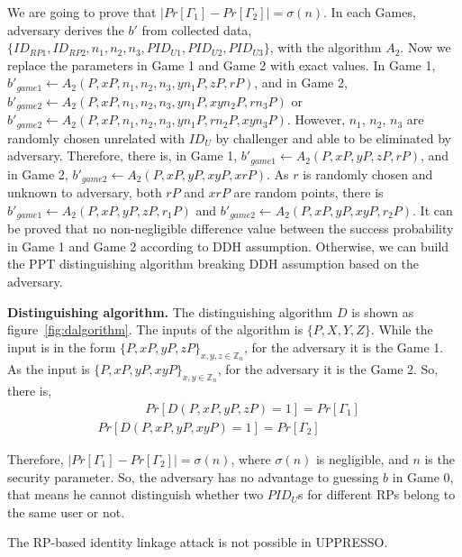 We are going to prove that $|Pr[\Gamma_1]-Pr[\Gamma_2]|=\sigma(n)$. In each Games, adversary derives the $b'$ from collected data, $\{ID_{RP1},ID_{RP2},n_1,n_2,n_3,PID_{U1},PID_{U2},PID_{U3}\}$, with the algorithm $A_2$. Now we replace the parameters in Game 1 and Game 2 with exact values. In Game 1, $b'_{game1}\gets A_2(P,xP,n_1,n_2,n_3,yn_1P,zP,rP)$, and in Game 2, $b'_{game2}\gets A_2(P,xP,n_1,n_2,n_3,yn_1P,xyn_2P,rn_3P)$ or $b'_{game2}\gets A_2(P,xP,n_1,n_2,n_3,yn_1P,rn_2P,xyn_3P)$. 
However, $n_1$, $n_2$, $n_3$ are randomly chosen unrelated with $ID_U$ by challenger and able to be eliminated by adversary. Therefore, there is, in Game 1, $b'_{game1}\gets A_2(P,xP,yP,zP,rP)$, and in Game 2, $b'_{game2}\gets A_2(P,xP,yP,xyP,xrP)$. As $r$ is randomly chosen and unknown to adversary, both $rP$ and $xrP$ are random points, there is $b'_{game1}\gets A_2(P,xP,yP,zP,r_1P)$ and $b'_{game2}\gets A_2(P,xP,yP,xyP,r_2P)$.  It can be proved that no non-negligible difference value between the success probability in Game 1 and Game 2 according to DDH assumption. Otherwise, we can build the PPT distinguishing algorithm breaking DDH assumption based on the adversary. 

\noindent\textbf{Distinguishing algorithm.} The distinguishing algorithm $D$ is shown as figure~\ref{fig:dalgorithm}. 
The inputs of the algorithm is $\{P,X,Y,Z\}$. While the input is in the form $\{P,xP,yP,zP\}_{x,y,z \in \mathbb{Z}_n}$, for the adversary it is the Game 1. As the input is $\{P,xP,yP,xyP\}_{x,y \in \mathbb{Z}_n}$, for the adversary it is the Game 2. So, there is,
\vspace{-\topsep}
\begin{multline*}
   \ \ \ \ \ \ \ \ \ \ \ \ \ \ \ \ \  Pr[D(P,xP,yP,zP)=1]=Pr[{\Gamma_1}]\\
   Pr[D(P,xP,yP,xyP)=1]=Pr[{\Gamma_2}]\ \ \ \ \ \ \ \ \ \ \ \ \ \ \ \ \ \ 
\end{multline*}

\vspace{-\topsep}
Therefore, $|Pr[\Gamma_1]-Pr[\Gamma_2]|=\sigma(n)$, where $\sigma(n)$ is negligible, and $n$ is the security parameter. So, the adversary has no advantage to guessing $b$ in Game 0, that means he cannot distinguish whether two $PID_U$s for different RPs belong to the same user or not. 

The RP-based identity linkage attack is not possible in UPPRESSO.


